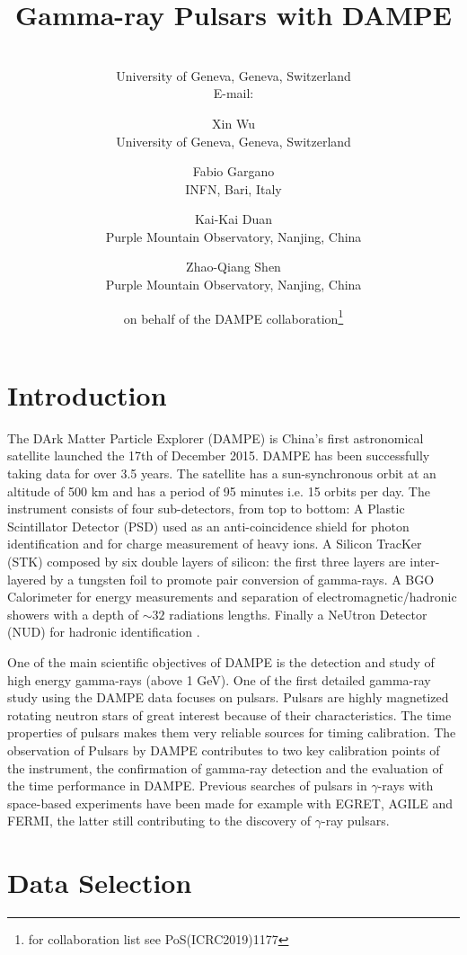 \documentclass{PoS}
\title{Gamma-ray Pulsars with DAMPE}
\author{\speaker{Maria Munoz}\\
        University of Geneva, Geneva, Switzerland\\
        E-mail: \email{maria.munoz@unige.ch}}
\author{Xin Wu\\
        University of Geneva, Geneva, Switzerland}
\author{Fabio Gargano\\
        INFN, Bari, Italy}
\author{Kai-Kai Duan\\
        Purple Mountain Observatory, Nanjing, China}
\author{Zhao-Qiang Shen\\
        Purple Mountain Observatory, Nanjing, China}
\author{on behalf of the DAMPE collaboration\footnote{for collaboration list see PoS(ICRC2019)1177}}
\begin{document}
\section{Introduction}


The DArk Matter Particle Explorer (DAMPE) is China's first astronomical satellite launched the 17th of December 2015. DAMPE has been successfully taking data for over 3.5 years.
The satellite has a sun-synchronous orbit at an altitude of  500 km and  has a period of 95 minutes i.e. 15 orbits per day.
The instrument consists of four sub-detectors, from top to bottom: A Plastic Scintillator Detector (PSD) used as an anti-coincidence shield for photon identification and for charge measurement of heavy ions.
A Silicon TracKer (STK) composed by six double layers of silicon: the first three layers are inter-layered  by a tungsten foil to promote pair conversion of gamma-rays.  A BGO Calorimeter for energy measurements and separation of electromagnetic/hadronic showers with a depth of $\sim 32$ radiations lengths. Finally a NeUtron Detector (NUD) for  hadronic identification \cite{dampe_mission}.

One of the main scientific objectives of DAMPE is the detection and study of  high energy gamma-rays (above 1 GeV). One of the first detailed gamma-ray study using the DAMPE data focuses on pulsars. Pulsars are highly magnetized rotating neutron stars of great interest because of their characteristics. The time  properties of pulsars makes them very reliable sources for timing calibration. The observation of Pulsars by DAMPE contributes to two key calibration points of the instrument, the confirmation of gamma-ray detection and the  evaluation of the time  performance in DAMPE.
Previous searches of pulsars  in  $\gamma$-rays  with space-based experiments have been made for example  with   EGRET, AGILE and  FERMI\cite{2catalogfermi}, the latter still contributing to the discovery of $\gamma$-ray pulsars.


\section{Data Selection}
\label{selection}
\end{document}
